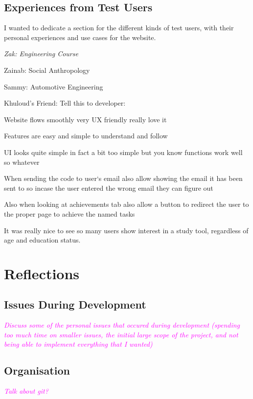 \documentclass{report}
\begin{document}
\section{Experiences from Test Users}

I wanted to dedicate a section for the different kinds of test users,
with their personal experiences and use cases for the website.

{\color{magenta}
\itshape
Zak: Engineering Course

Zainab: Social Anthropology

Sammy: Automotive Engineering

Khuloud's Friend: Tell this to developer:

Website flows smoothly very UX friendly really love it

Features are easy and simple to understand and follow

UI looks quite simple in fact a bit too simple but you know functions work well so whatever

When sending the code to user‘s email also allow showing the email it has been sent to so incase the user entered the wrong email they can figure out

Also when looking at achievements tab also allow a button to redirect the user to the proper page to achieve the named tasks

It was really nice to see so many users show interest in a study tool, regardless of age and education status.
}

\chapter{Reflections}

\section{Issues During Development}

\textcolor{magenta}{\textit{Discuss some of the personal issues that occured during development (spending too much time on smaller issues, the initial large scope of the project, and not being able to implement everything that I wanted)}}

\section{Organisation}

\textcolor{magenta}{\textit{Talk about git?}}
\end{document}
